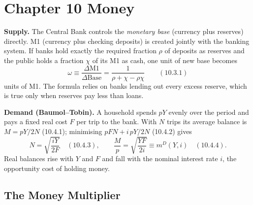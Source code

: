 \documentclass[12pt, letterpaper]{article}
\newcommand{\mD}{m^{D}}
\begin{document}
\section{Chapter 10 \quad Money}

\begin{tcolorbox}[theorybox,title={Chapter 10 Overview}]
\textbf{Supply.} The Central Bank controls the \emph{monetary base} (currency plus
reserves) directly. M1 (currency plus checking deposits) is created jointly with the
banking system. If banks hold exactly the required fraction $\rho$ of deposits as reserves
and the public holds a fraction $\chi$ of its M1 as cash, one unit of new base becomes
\[
\omega\equiv\frac{\Delta\text{M1}}{\Delta\text{Base}}=\frac{1}{\rho+\chi-\rho\chi}
\qquad(10.3.1)
\]
units of M1. The formula relies on banks lending out every excess reserve, which is true only
when reserves pay less than loans.

\smallskip
\textbf{Demand (Baumol--Tobin).} A household spends $pY$ evenly over the period and pays a
fixed real cost $F$ per trip to the bank. With $N$ trips its average balance is
$M=pY/2N$ (10.4.1); minimising $pFN+i\,pY/2N$ (10.4.2) gives
\[
N=\sqrt{\frac{iY}{2F}}\quad(10.4.3),\qquad
\frac{M}{p}=\sqrt{\frac{YF}{2i}}\equiv \mD(Y,i)\quad(10.4.4).
\]
Real balances rise with $Y$ and $F$ and fall with the nominal interest rate $i$, the
opportunity cost of holding money.
\end{tcolorbox}

\subsection{The Money Multiplier}
\end{document}
